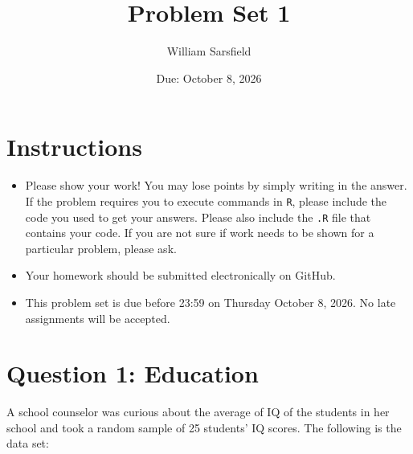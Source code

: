 \documentclass[12pt,letterpaper]{article}
\title{Problem Set 1}
\date{Due: October 8, 2026}
\author{William Sarsfield}
\begin{document}
	\maketitle
	
	\section*{Instructions}
	\begin{itemize}
	\item Please show your work! You may lose points by simply writing in the answer. If the problem requires you to execute commands in \texttt{R}, please include the code you used to get your answers. Please also include the \texttt{.R} file that contains your code. If you are not sure if work needs to be shown for a particular problem, please ask.
\item Your homework should be submitted electronically on GitHub.
\item This problem set is due before 23:59 on Thursday October 8, 2026. No late assignments will be accepted.
	\end{itemize}
	
	\vspace{1cm}
	\section*{Question 1: Education}

A school counselor was curious about the average of IQ of the students in her school and took a random sample of 25 students' IQ scores. The following is the data set:\\
\vspace{.5cm}

  
\vspace{1cm}
\end{document}
